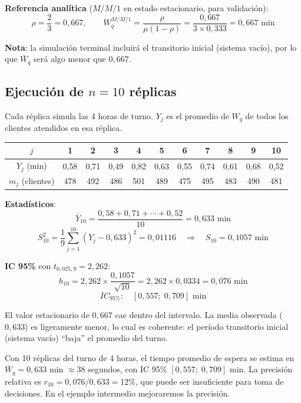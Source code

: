 \documentclass[11pt, letterpaper]{article}
\begin{document}
\textbf{Referencia analítica} ($M/M/1$ en estado estacionario, para validación):
\[
\rho = \frac{2}{3} = 0{,}667, \qquad W_q^{M/M/1} = \frac{\rho}{\mu(1-\rho)} = \frac{0{,}667}{3 \times 0{,}333} = 0{,}667 \text{ min}
\]

\textbf{Nota}: la simulación terminal incluirá el transitorio inicial (sistema vacío), por lo que $\bar W_q$ será algo menor que $0{,}667$.

\subsection{Ejecución de $n=10$ réplicas}

Cada réplica simula las 4 horas de turno. $Y_j$ es el promedio de $W_q$ de todos los clientes atendidos en esa réplica.

\begin{center}\small
\renewcommand{\arraystretch}{1.15}
\begin{tabular}{ccccccccccc}
\toprule
$j$ & 1 & 2 & 3 & 4 & 5 & 6 & 7 & 8 & 9 & 10 \\
\midrule
$Y_j$ (min) & 0{,}58 & 0{,}71 & 0{,}49 & 0{,}82 & 0{,}63 & 0{,}55 & 0{,}74 & 0{,}61 & 0{,}68 & 0{,}52 \\
$m_j$ (clientes) & 478 & 492 & 486 & 501 & 489 & 475 & 495 & 483 & 490 & 481 \\
\bottomrule
\end{tabular}
\end{center}

\textbf{Estadísticos}:
\[
\bar Y_{10} = \frac{0{,}58 + 0{,}71 + \cdots + 0{,}52}{10} = 0{,}633 \text{ min}
\]
\[
S_{10}^2 = \frac{1}{9}\sum_{j=1}^{10}(Y_j - 0{,}633)^2 = 0{,}01116 \quad \Rightarrow \quad S_{10} = 0{,}1057 \text{ min}
\]

\textbf{IC 95\%} con $t_{0{,}025,9} = 2{,}262$:
\[
h_{10} = 2{,}262 \times \frac{0{,}1057}{\sqrt{10}} = 2{,}262 \times 0{,}0334 = 0{,}076 \text{ min}
\]
\[
\boxed{IC_{95\%}: \quad [0{,}557;\; 0{,}709] \text{ min}}
\]

El valor estacionario de $0{,}667$ cae dentro del intervalo. La media observada ($0{,}633$) es ligeramente menor, lo cual es coherente: el período transitorio inicial (sistema vacío) ``baja'' el promedio del turno.

\begin{resultadobox}
Con 10 réplicas del turno de 4 horas, el tiempo promedio de espera se estima en $\bar W_q = 0{,}633$ min $\approx 38$ segundos, con IC 95\% $[0{,}557;\; 0{,}709]$ min. La precisión relativa es $r_{10} = 0{,}076/0{,}633 = 12\%$, que puede ser insuficiente para toma de decisiones. En el ejemplo intermedio mejoraremos la precisión.
\end{resultadobox}
\end{document}
